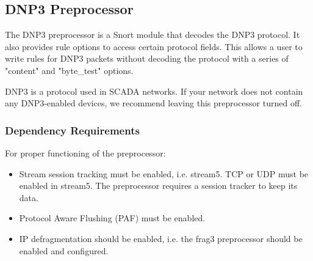 \documentclass[english]{report}
\begin{document}
\subsection{DNP3 Preprocessor}
\label{sub:dnp3}
The DNP3 preprocessor is a Snort module that decodes the DNP3 protocol.
It also provides rule options to access certain protocol fields.
This allows a user to write rules for DNP3 packets without decoding the protocol
with a series of "content" and "byte\_test" options.

DNP3 is a protocol used in SCADA networks. If your network does not contain any
DNP3-enabled devices, we recommend leaving this preprocessor turned off.

\subsubsection{Dependency Requirements}

For proper functioning of the preprocessor:
\begin{itemize}

\item Stream session tracking must be enabled, i.e. stream5. TCP or UDP must be
      enabled in stream5. The preprocessor requires a session tracker to keep its 
      data.

\item Protocol Aware Flushing (PAF) must be enabled.

\item IP defragmentation should be enabled, i.e. the frag3 preprocessor should be
      enabled and configured.

\end{itemize}
\end{document}
